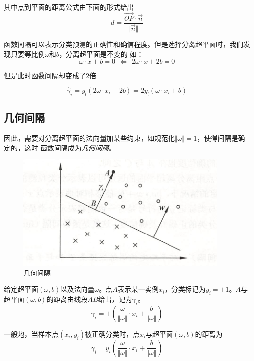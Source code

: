 其中点到平面的距离公式由下面的形式给出
\begin{equation}
    d=\frac{\overrightarrow{OP}\cdot \vec{n}}{\Vert \vec{n}\Vert}
\end{equation}

函数间隔可以表示分类预测的正确性和确信程度。但是选择分离超平面时，我们发现只要等比例$\omega$和$b$，分离超平面是不变的
如：
\begin{equation}
    \omega\cdot x+b=0\ \ \Leftrightarrow \ \  2\omega\cdot x+2b=0
\end{equation}

但是此时函数间隔却变成了$2$倍

\begin{equation}
    \hat{\gamma}_i=y_i(2\omega\cdot x_i+2b)=2y_i(\omega\cdot x_i+b)
\end{equation}

\subsection*{几何间隔}
因此，需要对分离超平面的法向量加某些约束，如规范化$\Vert \omega\Vert=1$，使得间隔是确定的，这时
函数间隔成为\textsl{几何间隔}。

\begin{figure}[H]
    \centering
    \includegraphics[scale=0.6]{figures/几何间隔.png}
    \caption{几何间隔}
\end{figure}

给定超平面$(\omega,b)$以及法向量$\omega$。点$A$表示某一实例$x_i$，分类标记为$y_i=\pm 1$。$A$与
超平面$(\omega,b)$的距离由线段$AB$给出，记为$\gamma_i$。
\begin{equation}
    \gamma_i=\pm(\frac{\omega}{\Vert \omega\Vert}\cdot x_i+\frac{b}{\Vert \omega\Vert})
\end{equation}

一般地，当样本点$(x_i,y_i)$被正确分类时，点$x_i$与超平面$(\omega,b)$的距离为
\begin{equation}
    \gamma_i=y_i(\frac{\omega}{\Vert \omega\Vert}\cdot x_i+\frac{b}{\Vert \omega\Vert})
\end{equation}

